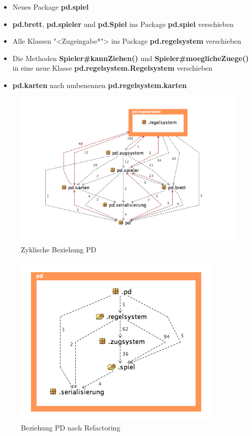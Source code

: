 \documentclass[12pt,halfparskip]{scrartcl}
\begin{document}
\begin{itemize}
	\item Neues Package \textbf{pd.spiel}
	\item \textbf{pd.brett}, \textbf{pd.spieler} und \textbf{pd.Spiel} ins Package \textbf{pd.spiel} verschieben
	\item Alle Klassen "<Zugeingabe*">  ins Package \textbf{pd.regelsystem} verschieben
	\item Die Methoden \textbf{Spieler\#kannZiehen()} und \textbf{Spieler\#moeglicheZuege()} in eine neue Klasse \textbf{pd.regelsystem.Regelsystem} verschieben
	\item \textbf{pd.karten} nach umbenennen \textbf{pd.regelsystem.karten}
\end{itemize}


\begin{figure}[H]
	\centering
	\includegraphics[width=0.8 \textwidth]{../design/probleme/package-level-vorher}
	\caption{Zyklische Beziehung PD}
\end{figure}

\begin{figure}[H]
	\centering
	\includegraphics[width=0.5 \textwidth]{../design/probleme/package-level-nachher}
	\caption{Beziehung PD nach Refactoring}
\end{figure}
\end{document}
